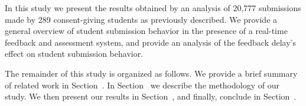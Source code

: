 In this study we present the results obtained by an analysis of 20,777
submissions made by 289 consent-giving students as previously described. We
provide a general overview of student submission behavior in the presence of a
real-time feedback and assessment system, and provide an analysis of the
feedback delay's effect on student submission behavior.

The remainder of this study is organized as follows. We provide a brief summary
of related work in Section~. In
Section~ we describe the methodology of our study. We
then present our results in Section~, and finally,
conclude in Section~.
